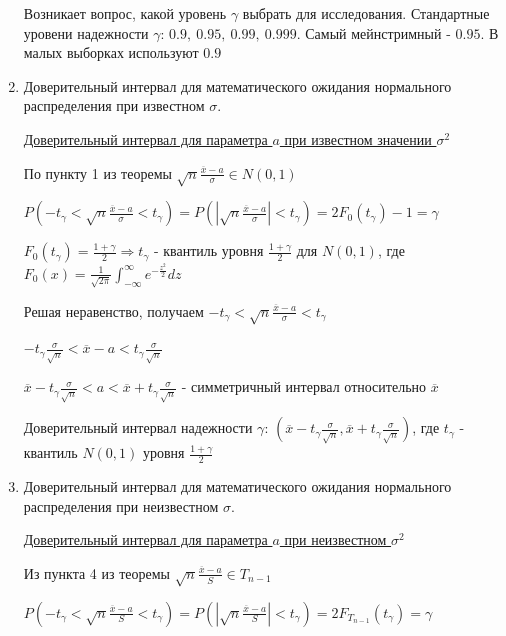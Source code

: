 \documentclass[12pt]{article}
\begin{document}
\begin{enumerate}
     Возникает вопрос, какой уровень $\gamma$ выбрать для исследования.
    Стандартные уровени надежности $\gamma$: $0.9, \ 0.95, \ 0.99, \ 0.999$. Самый мейнстримный - $0.95$. 
    В малых выборках используют $0.9$

    \item Доверительный интервал для математического ожидания нормального распределения при известном $\sigma$.

    \hyperlink{confidence_interval_for_a_known_sigma}{Доверительный интервал для параметра $a$ при известном значении $\sigma^2$}

    По пункту 1 из теоремы $\sqrt{n} \frac{\overline{x} - a}{\sigma} \in N(0, 1)$ 

    $P\left(-t_\gamma < \sqrt{n} \frac{\overline{x} - a}{\sigma} < t_\gamma\right) = 
    P\left(\left|\sqrt{n} \frac{\overline{x} - a}{\sigma}\right| < t_\gamma\right) = 2F_0 (t_\gamma) - 1 = \gamma$

    $F_0(t_\gamma) = \frac{1 + \gamma}{2} \Longrightarrow t_\gamma$ - квантиль уровня 
    $\frac{1 + \gamma}{2}$ для $N(0, 1)$, где
    $F_0(x) = \frac{1}{\sqrt{2\pi}} \int_{-\infty}^{\infty} e^{-\frac{z^2}{2}} dz$

    Решая неравенство, получаем $-t_\gamma < \sqrt{n} \frac{\overline{x} - a}{\sigma} < t_\gamma$

    $-t_\gamma \frac{\sigma}{\sqrt{n}} < \overline{x} - a < t_\gamma \frac{\sigma}{\sqrt{n}}$

    $\overline{x} - t_\gamma \frac{\sigma}{\sqrt{n}} < a < \overline{x} + t_\gamma \frac{\sigma}{\sqrt{n}}$ - 
    симметричный интервал относительно $\overline{x}$

    Доверительный интервал надежности $\gamma$: $\left(\overline{x} - t_\gamma \frac{\sigma}{\sqrt{n}}, 
    \overline{x} + t_\gamma \frac{\sigma}{\sqrt{n}}\right)$, 
    где $t_\gamma$ - квантиль $N(0, 1)$ уровня $\frac{1 + \gamma}{2}$

    \item Доверительный интервал для математического ожидания нормального распределения при неизвестном $\sigma$.

    \hyperlink{confidence_interval_for_a_unknown_sigma}{Доверительный интервал для параметра $a$ при неизвестном $\sigma^2$}

    Из пункта 4 из теоремы $\sqrt{n} \frac{\overline{x} - a}{S} \in T_{n - 1}$

    $P\left(-t_\gamma < \sqrt{n} \frac{\overline{x} - a}{S} < t_\gamma\right) = P\left(\left|\sqrt{n} \frac{\overline{x} - a}{S}\right| < t_\gamma\right) = 2F_{T_{n - 1}}(t_\gamma) = \gamma$


\end{enumerate}
\end{document}
